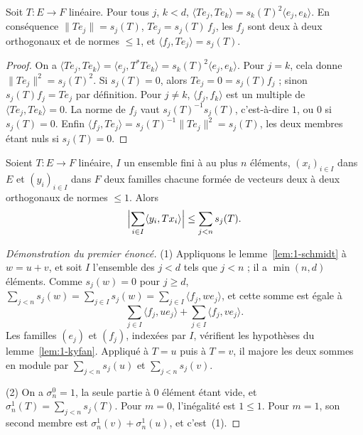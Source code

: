 \begin{lemme}\label{lem:1-schmidt}
Soit $T : E \to F$ linéaire. Pour tous $j$, $k < d$, $\langle Te_j, Te_k\rangle = s_k(T)^2 \langle e_j, e_k\rangle$. En conséquence $\|Te_j\| = s_j(T)$, $Te_j = s_j(T)\, f_j$, les $f_j$ sont deux à deux orthogonaux et de normes $\leq 1$, et $\langle f_j, Te_j\rangle = s_j(T)$.
\end{lemme}

\begin{proof}
On a $\langle Te_j, Te_k\rangle = \langle e_j, T^*Te_k\rangle = s_k(T)^2 \langle e_j, e_k\rangle$. Pour $j = k$, cela donne $\|Te_j\|^2 = s_j(T)^2$. Si $s_j(T) = 0$, alors $Te_j = 0 = s_j(T) f_j$ ; sinon $s_j(T) f_j = Te_j$ par définition. Pour $j \neq k$, $\langle f_j, f_k\rangle$ est un multiple de $\langle Te_j, Te_k\rangle = 0$. La norme de $f_j$ vaut $s_j(T)^{-1} s_j(T)$, c'est-à-dire $1$, ou $0$ si $s_j(T) = 0$. Enfin $\langle f_j, Te_j\rangle = s_j(T)^{-1} \|Te_j\|^2 = s_j(T)$, les deux membres étant nuls si $s_j(T) = 0$.
\end{proof}

\begin{lemme}\label{lem:1-kyfan}
Soient $T : E \to F$ linéaire, $I$ un ensemble fini à au plus $n$ éléments, $(x_i)_{i \in I}$ dans $E$ et $(y_i)_{i \in I}$ dans $F$ deux familles chacune formée de vecteurs deux à deux orthogonaux de normes $\leq 1$. Alors
\[
  \Bigl| \sum_{i \in I} \langle y_i, T x_i\rangle \Bigr| \leq \sum_{j < n} s_j(T).
\]
\end{lemme}


\begin{proof}[Démonstration du premier énoncé]
(1) Appliquons le lemme~\ref{lem:1-schmidt} à $w = u + v$, et soit $I$ l'ensemble des $j < d$ tels que $j < n$ ; il a $\min(n, d)$ éléments. Comme $s_j(w) = 0$ pour $j \geq d$, $\sum_{j < n} s_j(w) = \sum_{j \in I} s_j(w) = \sum_{j \in I} \langle f_j, w e_j\rangle$, et cette somme est égale à
\[
  \sum_{j \in I} \langle f_j, u e_j\rangle + \sum_{j \in I} \langle f_j, v e_j\rangle .
\]
Les familles $(e_j)$ et $(f_j)$, indexées par $I$, vérifient les hypothèses du lemme~\ref{lem:1-kyfan}. Appliqué à $T = u$ puis à $T = v$, il majore les deux sommes en module par $\sum_{j<n} s_j(u)$ et $\sum_{j<n} s_j(v)$.

(2) On a $\sigma_n^0 = 1$, la seule partie à $0$ élément étant vide, et $\sigma_n^1(T) = \sum_{j<n} s_j(T)$. Pour $m = 0$, l'inégalité est $1 \leq 1$. Pour $m = 1$, son second membre est $\sigma_n^1(v) + \sigma_n^1(u)$, et c'est~(1).
\end{proof}


